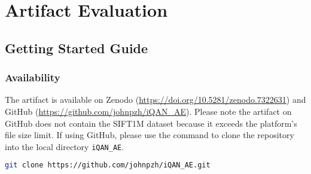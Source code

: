 %
%
%
%
%
%
%
%
%
%


\appendix
\section{Artifact Evaluation}

\subsection{Getting Started Guide}

\subsubsection{Availability}

The artifact is available on Zenodo (\url{https://doi.org/10.5281/zenodo.7322631}) and GitHub (\url{https://github.com/johnpzh/iQAN_AE}). Please note the artifact on GitHub does not contain the SIFT1M dataset because it exceeds the platform's file size limit. If using GitHub, please use the command to clone the repository into the local directory \verb|iQAN_AE|.
\begin{lstlisting}[language=bash]
git clone https://github.com/johnpzh/iQAN_AE.git
\end{lstlisting}

